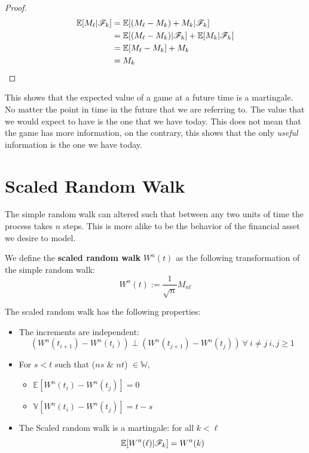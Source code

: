 \documentclass[../TGMAFFIRO]{subfiles}
\begin{document}
\begin{proof}
	\begin{align*}
				\mathbb{E}[M_\ell|\mathscr{F}_k] &= \mathbb{E}[(M_\ell - M_k) + M_k | \mathscr{F}_k] \\
				&= \mathbb{E}[(M_\ell - M_k) | \mathscr{F}_k] + \mathbb{E}[M_k | \mathscr{F}_k] \\
				&= \mathbb{E}[M_\ell - M_k] + M_k\\
				&= M_k
	\end{align*}
\end{proof}

This shows that the expected value of a game at a future time is a martingale. No matter the point in time in the future that we are referring to. The value that we would expect to have is the one that we have today. This does not mean that the game has more information, on the contrary, this shows that the only \textit{useful} information is the one we have today. \\


\section{Scaled Random Walk}
The simple random walk can altered such that between any two units of time the process takes $n$ steps. This is more alike to be the behavior of the financial asset we desire to model. 

\begin{definition}
	We define the \textbf{scaled random walk} $W^n(t)$ as the following transformation of the simple random walk:
	\[W^n(t) := \frac{1}{\sqrt{n}}M_{nt}\]
\end{definition}

\begin{remark}
	The scaled random walk has the following properties:
	\begin{itemize}
		\item The increments are independent: \[\left(W^n(t_{i+1}) - W^n(t_{i})\right) \perp \left(W^n(t_{j+1}) - W^n(t_{j})\right) \ \forall \ i \neq j \ i, j \geq 1\]
		\item For $s < t$ such that ($ns$ \& $nt$) $\in \mathbb{W}$, 
		\begin{itemize}
			\item $\mathbb{E}[W^n(t_{i}) - W^n(t_{j})] = 0$ 
			\item $\mathbb{V}[W^n(t_{i}) - W^n(t_{j})] = t - s$
		\end{itemize}
		\item The Scaled random walk is a martingale: for all $k < \ell$
		\[\mathbb{E}[W^n(\ell) | \mathscr{F}_k] = W^n(k)\]
	\end{itemize}
\end{remark}
\end{document}
